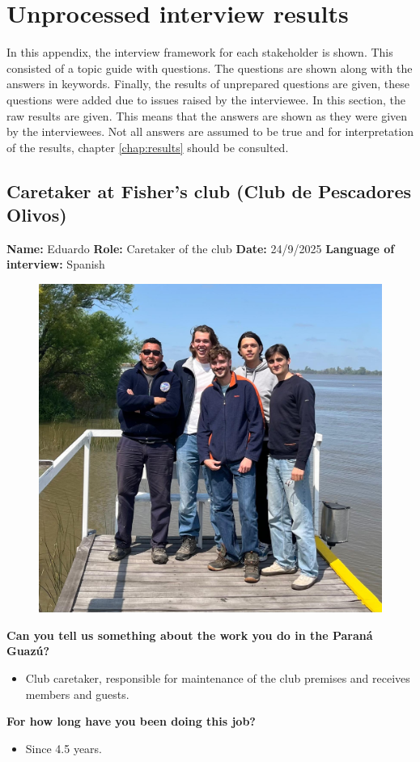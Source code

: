 \chapter{Unprocessed interview results}
\label{chap:interviews}
In this appendix, the interview framework for each stakeholder is shown. This consisted of a topic guide with questions. The questions are shown along with the answers in keywords. Finally, the results of unprepared questions are given, these questions were added due to issues raised by the interviewee. In this section, the raw results are given. This means that the answers are shown as they were given by the interviewees. Not all answers are assumed to be true and for interpretation of the results, chapter \ref{chap:results} should be consulted.

\section{Caretaker at Fisher's club (Club de Pescadores Olivos)}
\textbf{Name:} Eduardo \newline
\textbf{Role:} Caretaker of the club \newline
\textbf{Date:} 24/9/2025 \newline
\textbf{Language of interview:} Spanish

\begin{figure}[H]
    \centering
    \includegraphics[width=0.4\linewidth]{figures/appendixE/InterviewFisher.jpeg}
\end{figure}

\textbf{Can you tell us something about the work you do in the Paraná Guazú?}
\begin{itemize}
    \item Club caretaker, responsible for maintenance of the club premises and receives members and guests.
\end{itemize}

\textbf{For how long have you been doing this job?}
\begin{itemize}
    \item Since 4.5 years.
\end{itemize}


